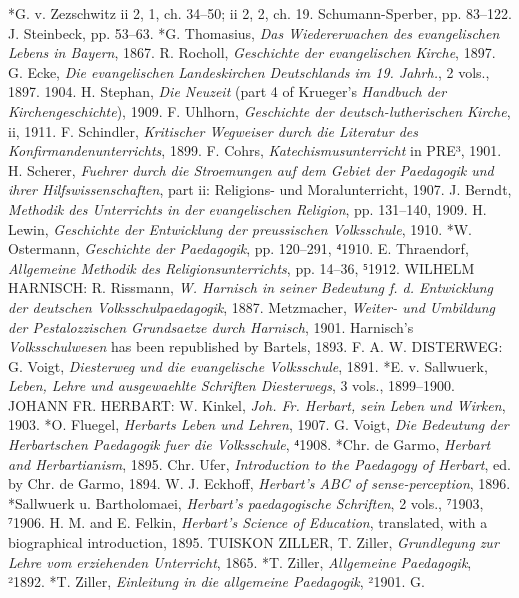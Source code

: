 *G. v. Zezschwitz ii 2, 1, ch. 34–50; ii 2, 2, ch. 19. Schumann-Sperber, pp. 83–122. J. Steinbeck, pp. 53–63. *G. Thomasius, \emph{Das Wiedererwachen des evangelischen Lebens in Bayern}, 1867. R. Rocholl, \emph{Geschichte der evangelischen Kirche}, 1897. G. Ecke, \emph{Die evangelischen Landeskirchen Deutschlands im 19. Jahrh.}, 2 vols., 1897. 1904. H. Stephan, \emph{Die Neuzeit} (part 4 of Krueger’s \emph{Handbuch der Kirchengeschichte}), 1909. F. Uhlhorn, \emph{Geschichte der deutsch-lutherischen Kirche}, ii, 1911. F. Schindler, \emph{Kritischer Wegweiser durch die Literatur des Konfirmandenunterrichts}, 1899. F. Cohrs, \emph{Katechismusunterricht} in PRE³, 1901. H. Scherer, \emph{Fuehrer durch die Stroemungen auf dem Gebiet der Paedagogik und ihrer Hilfswissenschaften}, part ii: Religions- und Moralunterricht, 1907. J. Berndt, \emph{Methodik des Unterrichts in der evangelischen Religion}, pp. 131–140, 1909. H. Lewin, \emph{Geschichte der Entwicklung der preussischen Volksschule}, 1910. *W. Ostermann, \emph{Geschichte der Paedagogik}, pp. 120–291, ⁴1910. E. Thraendorf, \emph{Allgemeine Methodik des Religionsunterrichts}, pp. 14–36, ⁵1912. WILHELM HARNISCH: R. Rissmann, \emph{W. Harnisch in seiner Bedeutung f. d. Entwicklung der deutschen Volksschulpaedagogik}, 1887. Metzmacher, \emph{Weiter- und Umbildung der Pestalozzischen Grundsaetze durch Harnisch}, 1901. Harnisch’s \emph{Volksschulwesen} has been republished by Bartels, 1893. F. A. W. DISTERWEG: G. Voigt, \emph{Diesterweg und die evangelische Volksschule}, 1891. *E. v. Sallwuerk, \emph{Leben, Lehre und ausgewaehlte Schriften Diesterwegs}, 3 vols., 1899–1900. JOHANN FR. HERBART: W. Kinkel, \emph{Joh. Fr. Herbart, sein Leben und Wirken}, 1903. *O. Fluegel, \emph{Herbarts Leben und Lehren}, 1907. G. Voigt, \emph{Die Bedeutung der Herbartschen Paedagogik fuer die Volksschule}, ⁴1908. *Chr. de Garmo, \emph{Herbart and Herbartianism}, 1895. Chr. Ufer, \emph{Introduction to the Paedagogy of Herbart}, ed. by Chr. de Garmo, 1894. W. J. Eckhoff, \emph{Herbart’s ABC of sense-perception}, 1896. *Sallwuerk u. Bartholomaei, \emph{Herbart’s paedagogische Schriften}, 2 vols., ⁷1903, ⁷1906. H. M. and E. Felkin, \emph{Herbart’s Science of Education}, translated, with a biographical introduction, 1895. TUISKON ZILLER, T. Ziller, \emph{Grundlegung zur Lehre vom erziehenden Unterricht}, 1865. *T. Ziller, \emph{Allgemeine Paedagogik}, ²1892. *T. Ziller, \emph{Einleitung in die allgemeine Paedagogik}, ²1901. G.
